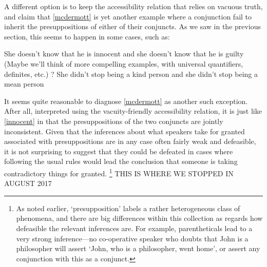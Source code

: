\documentclass[If.tex]{subfiles}
\begin{document}
A different option is to keep the accessibility relation that relies on vacuous truth, and claim that \ref{mcdermott} is yet another example where a conjunction fail to inherit the presuppositions of either of their conjuncts.  As we saw in the previous section, this seems to happen in some cases, such as:
\begin{prop}
	\nitem \label{innocent}
	She doesn't know that he is innocent and she doesn't know that he is guilty
	\nitem
	(Maybe we'll think of more compelling examples, with universal quantifiers, definites, etc.)
	? She didn't stop being a kind person and she didn't stop being a mean person

\end{prop}
It seems quite reasonable to diagnose \ref{mcdermott} as another such exception.  After all, interpreted using the vacuity-friendly accessibility relation, it is just like \ref{innocent} in that the presuppositions of the two conjuncts are jointly inconsistent.  Given that the inferences about what speakers take for granted associated with presuppositions are in any case often fairly weak and defeasible, it is not surprising to suggest that they could be defeated in cases where following the usual rules would lead the conclusion that someone is taking contradictory things for granted.%
\footnote{As noted earlier, ‘presupposition’ labels a rather heterogeneous class of phenomena, and there are big differences within this collection as regards how defeasible the relevant inferences are.  For example, parentheticals lead to a very strong inference---no co-operative speaker who doubts that John is a philosopher will assert ‘John, who is a philosopher, went home’, or assert any conjunction with this as a conjunct.}  
THIS IS WHERE WE STOPPED IN AUGUST 2017
\end{document}
